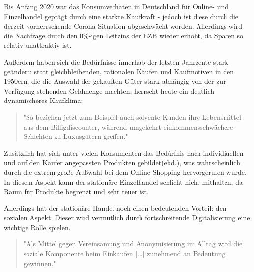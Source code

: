 

\iffalse
 alles einfacher und unkompliziert

 Vorreiter in sachen niedrige Preise > ist sehr wichtig, weil
   viel einfacher vergelichbar, qualität des Produkts nicht einfach einsehbar: sie muss nicht außergewöhnlich, nur akzeptabel sein - jedoch auch nicht schlecht, da 14-tage-rückgabe ohne angabe eines grundes

 einfluss extrem in coronazeiten

 S 49 https://edoc.sub.uni-hamburg.de/hcu/volltexte/2017/370/pdf/Ebert_Kirsten.pdf
 danach: modell für veränderung
\fi


Bis Anfang 2020 war das Konsumverhaten in Deutschland für Online- und Einzelhandel geprägt durch eine starkte Kaufkraft - jedoch ist diese durch die derzeit vorherrschende Corona-Situation abgeschwächt worden\cite{BfWE}. Allerdings wird die Nachfrage durch den 0\%-igen Leitzins der \ac{EZB} wieder erhöht, da Sparen so relativ unattraktiv ist\cite[S. 49]{Ebert}.

Außerdem haben sich die Bedürfnisse innerhab der letzten Jahrzente stark geändert: statt gleichbleibenden, rationalen Käufen und Kaufmotiven in den 1950ern, die die Auswahl der gekauften Güter stark abhängig von der zur Verfügung stehenden Geldmenge machten\cite[S. 38]{Schramm}, herrscht heute ein deutlich dynamischeres Kaufklima:
\begin{quote}
"So beziehen jetzt zum Beispiel auch solvente Kunden ihre Lebensmittel aus dem Billigdiscounter, während  umgekehrt  einkommensschwächere  Schichten  zu  Luxusgütern  greifen."\cite[S. 43]{Nitt}
\end{quote}

Zusätzlich hat sich unter vielen Konsumenten das Bedürfnis nach individiuellen und auf den Käufer angepassten Produkten gebildet(ebd.), was wahrscheinlich durch die extrem große Außwahl bei dem Online-Shopping hervorgerufen wurde. In diesem Aspekt kann der stationäre Einzelhandel schlicht nicht mithalten, da Raum für Produkte begrenzt und sehr teuer ist.

Allerdings hat der stationäre Handel noch einen bedeutenden Vorteil: den sozialen Aspekt. Dieser wird vermutlich durch fortschreitende Digitalisierung eine wichtige Rolle spielen\cite[S. 50]{Ebert}.
\begin{quote}
"Als Mittel gegen Vereinsamung und Anonymisierung im Alltag wird die soziale Komponente beim Einkaufen [...] zunehmend an Bedeutung gewinnen."\cite[S. 43]{Nitt}
\end{quote}
